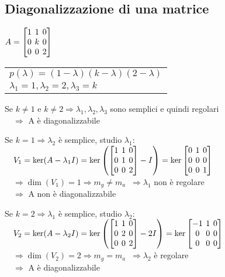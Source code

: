 \subsection{Diagonalizzazione di una matrice}
$
A = \left[
	\arraycolsep=2.0pt\def\arraystretch{1.0}
	\begin{array}{@{}ccc@{}}
		1 & 1 & 0 \\
		0 & k & 0\\
		0 & 0 & 2\\
	\end{array}
\right]
$
\begin{tabular}{l}
	$p(\lambda) = (1-\lambda)(k-\lambda)(2-\lambda)$ \\
	$\lambda_1 = 1, \lambda_2 = 2, \lambda_3 = k$
\end{tabular}

Se $k\neq1$ e $k\neq2 \Rightarrow \lambda_1, \lambda_2, \lambda_3$ sono semplici e quindi regolari \\
$\quad\Rightarrow$ A è diagonalizzabile

Se $k = 1 \Rightarrow \lambda_2$ è semplice, studio $\lambda_1$: \\
$\quad V_1 = \ker(A-\lambda_1I) = \ker
\left(
	\left[
		\arraycolsep=2.0pt\def\arraystretch{1.0}
		\begin{array}{@{}ccc@{}}
			1 & 1 & 0 \\
			0 & 1 & 0\\
			0 & 0 & 2\\
		\end{array}
	\right] - I 
\right) = \ker
\left[
	\arraycolsep=2.0pt\def\arraystretch{1.0}
	\begin{array}{@{}ccc@{}}
		0 & 1 & 0 \\
		0 & 0 & 0\\
		0 & 0 & 1\\
	\end{array}
\right]$ \\
$\quad \Rightarrow \dim(V_1) = 1 \Rightarrow m_g \neq m_a$
$\ \Rightarrow \lambda_1$ non è regolare \\
$\quad \Rightarrow$ A non è diagonalizzabile


Se $k = 2 \Rightarrow \lambda_1$ è semplice, studio $\lambda_2$:\\
$\quad V_2 = \ker(A-\lambda_2I) = \ker
\left(
	\left[
		\arraycolsep=2.0pt\def\arraystretch{1.0}
		\begin{array}{@{}ccc@{}}
			1 & 1 & 0 \\
			0 & 2 & 0\\
			0 & 0 & 2\\
		\end{array}
	\right] - 2I 
\right) = \ker
\left[
	\arraycolsep=2.0pt\def\arraystretch{1.0}
	\begin{array}{@{}ccc@{}}
		-1 & 1 & 0 \\
		0 & 0 & 0\\
		0 & 0 & 0\\
	\end{array}
\right]$ \\
$\quad \Rightarrow \dim(V_2) = 2 \Rightarrow m_g = m_a$
$\ \Rightarrow \lambda_2$ è regolare \\
$\quad \Rightarrow$ A è diagonalizzabile
